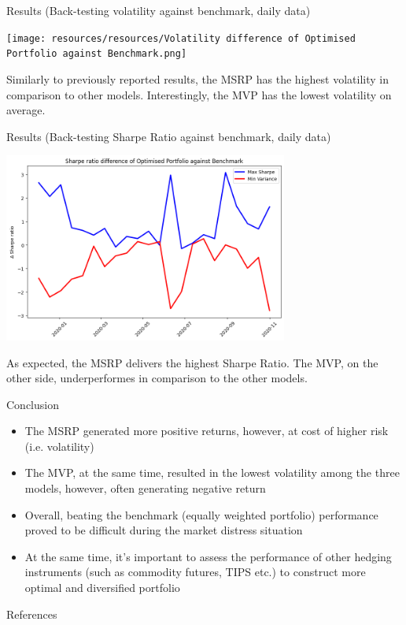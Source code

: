 \documentclass{beamer}
\begin{document}
\begin{frame}{Results (Back-testing volatility against benchmark, daily data)}
    \begin{center}
        \texttt{[image: resources/resources/Volatility difference of Optimised Portfolio against Benchmark.png]}
    \end{center}    
\small{Similarly to previously reported results, the MSRP has the highest volatility in comparison to other models. Interestingly, the MVP has the lowest volatility on average.}
\end{frame}

\begin{frame}{Results (Back-testing Sharpe Ratio against benchmark, daily data)}
    \begin{center}
        \includegraphics[width=0.7\textwidth]{resources/Sharpe ratio difference of Optimised Portfolio against Benchmark.png}
    \end{center}
\small{As expected, the MSRP delivers the highest Sharpe Ratio. The MVP, on the other side, underperformes in comparison to the other models.}
\end{frame}

\begin{frame}{Conclusion}
    \begin{itemize}
        \item The MSRP generated more positive returns, however, at cost of higher risk (i.e. volatility)
        \item  The MVP, at the same time, resulted in the lowest volatility among the three models, however, often generating negative return
        \item Overall, beating the benchmark (equally weighted portfolio) performance proved to be difficult during the market distress situation
        \item At the same time, it's important to assess the performance of other hedging instruments (such as commodity futures, TIPS etc.) to construct more optimal and diversified portfolio
    \end{itemize}
\end{frame}

\begin{frame}{References}
\printbibliography
\end{frame}
\end{document}

